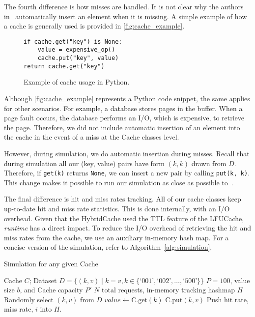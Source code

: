 The fourth difference is how misses are handled.
It is not clear why the
authors in~\cite{shah2023ImprovedCacheEviction}
automatically insert an element when it is missing.
A simple example of how a cache
is generally used is provided in \autoref{fig:cache_example}.

\begin{figure}[ht]
    \centering
    \begin{tcolorbox}[colback=gray!5!white, colframe=gray!75!black, title=General Cache Example]
    \begin{verbatim}
if cache.get("key") is None:
    value = expensive_op()
    cache.put("key", value)
return cache.get("key")
    \end{verbatim}
    \end{tcolorbox}
    \caption{Example of cache usage in Python.}
    \label{fig:cache_example}
\end{figure}

Although \autoref{fig:cache_example}
represents a Python code snippet, the same
applies for other scenarios. For example,
a database stores pages in the buffer. When a
page fault
occurs, the database performs an I/O, which
is expensive, to retrieve the page.
Therefore, we did not include automatic
insertion of an element into the cache in
the event of a miss at the Cache classes level.

However, during simulation, we do automatic insertion
during misses. Recall that during simulation
all our (key, value) pairs have form $(k, k)$
drawn from $D$.
Therefore, if \texttt{get(k)} returns \texttt{None},
we can insert a new pair by calling \texttt{put(k, k)}.
This change makes it possible to run our simulation
as close as possible to~\cite{shah2023ImprovedCacheEviction}.

The final difference is hit and miss rates tracking.
All of our cache classes keep up-to-date hit and miss
rate statistics. This is done internally, with an I/O overhead.
Given that the HybridCache used the TTL feature
of the LFUCache, \textit{runtime} has a direct
impact. To reduce the I/O overhead
of retrieving the hit and miss rates from
the cache, we use an auxiliary in-memory hash map.
For a concise version of the simulation,
refer to Algorithm~\ref{alg:simulation}.

\begin{algorithm}
    \caption{Simulation for any given Cache}
    \label{alg:simulation}
    \begin{algorithmic}[1]
    \Require Cache $C$; Dataset $D = \{(k, v) \mid k = v, k \in \{\text{`001'}, \text{`002'}, \ldots, \text{`500'}\}\}$
    \Require $P=100$, value size $b$, and Cache capacity $P'$
    \Require $N$ total requests,
        in-memory tracking hashmap $H$
        \State Randomly select $(k, v)$ from $D$
        \State $value \gets \text{C.get}(k)$
            \State $\text{C.put}(k, v)$
        \EndIf
        \State Push hit rate, miss rate, $i$ into $H$.
    \EndFor
    \end{algorithmic}
\end{algorithm}